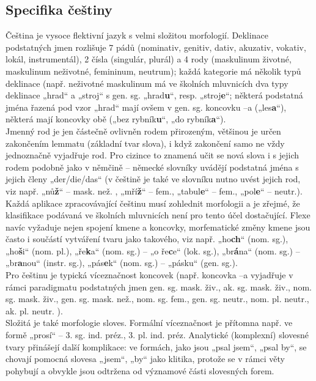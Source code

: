 \documentclass[]{../../metanetpaper}
\begin{document}
\begin{multicols}{2}
\subsection{Specifika češtiny}

Čeština je vysoce flektivní jazyk s velmi složitou morfologií. Deklinace podstatných jmen rozlišuje 7 pádů (nominativ, genitiv, dativ, akuzativ, vokativ, lokál, instrumentál), 2 čísla (singulár, plurál) a 4 rody (maskulinum životné, maskulinum neživotné, femininum, neutrum); každá kategorie má několik typů deklinace (např. neživotné maskulinum má ve školních mluvnicích dva typy deklinace „hrad“ a „stroj“ s gen. sg. „hrad\textbf{u}“, resp. „stroj\textbf{e}“; některá podstatná jména řazená pod vzor „hrad“ mají ovšem v gen. sg. koncovku –a („les\textbf{a}“), některá mají koncovky obě („bez rybník\textbf{u}“, „do rybník\textbf{a}“).\\
Jmenný rod je jen částečně ovlivněn rodem přirozeným, většinou je určen zakončením lemmatu (základní tvar slova), i když zakončení samo ne vždy jednoznačně vyjadřuje rod. Pro cizince to znamená učit se nová slova i s jejich rodem podobně jako v němčině – německé slovníky uvádějí podstatná jména s jejich členy „der/die/das“ (v češtině je také ve slovníku nutno uvést jejich rod, viz např. „nů\textbf{ž}“ – mask. než. , „mří\textbf{ž}“ – fem., „tabul\textbf{e}“ – fem., „pol\textbf{e}“ – neutr.).\\
Každá aplikace zpracovávající češtinu musí zohlednit morfologii a je zřejmé, že klasifikace podávaná ve školních mluvnicích není pro tento účel dostačující. Flexe navíc vyžaduje nejen spojení kmene a koncovky, morfematické změny kmene jsou často i součástí vytváření tvaru jako takového, viz např. „ho\textbf{ch}“ (nom. sg.), „ho\textbf{š}i“ (nom. pl.), „ře\textbf{k}a“ (nom. sg.) – „o ře\textbf{c}e“ (lok. sg.), „br\textbf{á}na“ (nom. sg.) – „br\textbf{a}nou“ (instr. sg.), „pás\textbf{e}k“ (nom. sg.) – „pásku“ (gen. sg.).\\
Pro češtinu je typická víceznačnost koncovek (např. koncovka –a vyjadřuje v rámci paradigmatu podstatných jmen gen. sg. mask. živ., ak. sg. mask. živ., nom. sg. mask. živ., gen. sg. mask. než., nom. sg. fem., gen. sg. neutr., nom. pl. neutr., ak. pl. neutr. ).\\
Složitá je také morfologie sloves. Formální víceznačnost je přítomna např. ve formě „prosí“ – 3. sg. ind. préz., 3. pl. ind. préz. Analytické (komplexní) slovesné tvary přinášejí další komplikace: ve formách, jako jsou „psal jsem“, „psal by“, se chovají pomocná slovesa „jsem“, „by“ jako klitika, protože se  v rámci věty pohybují a obvykle jsou odtržena od významové části slovesných forem.\\

\end{multicols}
\end{document}
